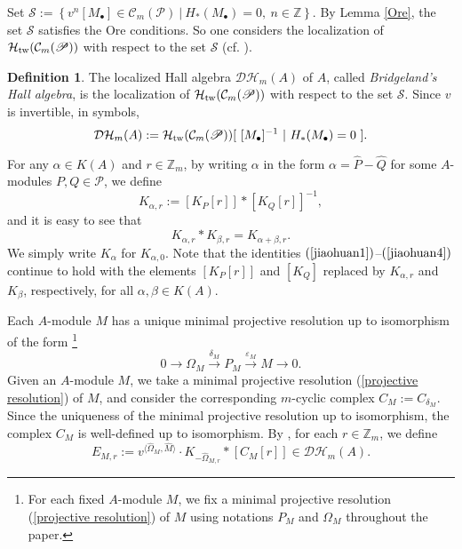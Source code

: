 \documentclass[reqno,12pt]{amsart}
\numberwithin{equation}{section}
\theoremstyle{plain}
\theoremstyle{definition}
\newtheorem{definition}[theorem]{\bf Definition}
\begin{document}
Set $\mathscr{S}:=\left\{v^n[{{M}_{\bullet }}]\in {{\mathcal{C}}_{m}}(\mathscr{P})~|~{{ {H}}_{*}}({{M}_{\bullet }})=0,~ n\in\mathbb{Z}\right\}$. By Lemma
\ref{Ore}, the set $\mathscr{S}$ satisfies the Ore conditions. So one considers the localization of $\mathcal {H}_{\rm tw}(\mathcal{C}_m(\mathscr{P}))$ with respect to the set $\mathscr{S}$ (cf. \cite{Br,ChenD}).

\begin{definition}
The localized Hall algebra $\mathcal {D}\mathcal {H}_m(A)$ of $A$, called \emph{Bridgeland's Hall algebra}, is the localization of $\mathcal {H}_{\rm tw}(\mathcal{C}_m(\mathscr{P}))$ with respect to the set $\mathscr{S}$.
Since $v$ is invertible,
in symbols, $$\mathcal {D}\mathcal {H}_m(A):=\mathcal {H}_{\rm tw}(\mathcal{C}_m(\mathscr{P}))[~[M_\bullet]^{-1}~|~H_\ast(M_\bullet)=0~].$$

\end{definition}

For any $\alpha \in K(A)$ and $r\in \mathbb{Z}_m$, by writing $\alpha$ in the form $\alpha =\hat{P}-\hat{Q}$ for some $A$-modules $P,Q\in\mathscr{P}$, we define
$${{K}_{\alpha ,r}}:=[{{K}_{P}}[r]]*{{[K_Q[r]]}^{-1}},$$
and it is easy to see that \begin{equation}\label{kejia}
K_{\alpha,r}\ast K_{\beta,r}=K_{\alpha+\beta,r}.\end{equation}
We simply write $K_\alpha$ for $K_{\alpha,0}$.
Note that the identities $(\ref{jiaohuan1})$--$(\ref{jiaohuan4})$ continue to hold with the elements $[K_P[r]]$ and $[K_Q]$ replaced by $K_{\alpha,r}$ and $K_\beta$, respectively, for all $\alpha, \beta \in K(A)$.

Each $A$-module $M$ has a unique minimal projective resolution up to isomorphism of the form \footnote{For each fixed $A$-module $M$, we fix a minimal projective resolution (\ref{projective resolution}) of $M$ using notations $P_M$ and $\Omega_M$ throughout the paper.}
\begin{equation}\label{projective resolution}
0{\longrightarrow} {\Omega}_M\stackrel{\delta_M}{\longrightarrow} P_M\stackrel{{\varepsilon}_M}{\longrightarrow}
M{\longrightarrow} 0.
\end{equation}
Given an $A$-module $M$,
we take a minimal projective resolution (\ref{projective resolution}) of $M$, and consider the corresponding $m$-cyclic complex
$C_M:=C_{\delta_M}$.
Since the uniqueness of the minimal projective resolution up to isomorphism, the complex $C_M$ is well-defined up to isomorphism.
By \cite{Br,ChenD}, for each $r\in\mathbb{Z}_m$, we define  $$E_{M,r} := v^{{\langle {\hat{\Omega}_M,\hat{M}}\rangle}} \cdot {K_{-\hat{\Omega}_{M,r}}} \ast [C_M[r]] \in \mathcal {D}\mathcal {H}_m(A).$$
\end{document}
